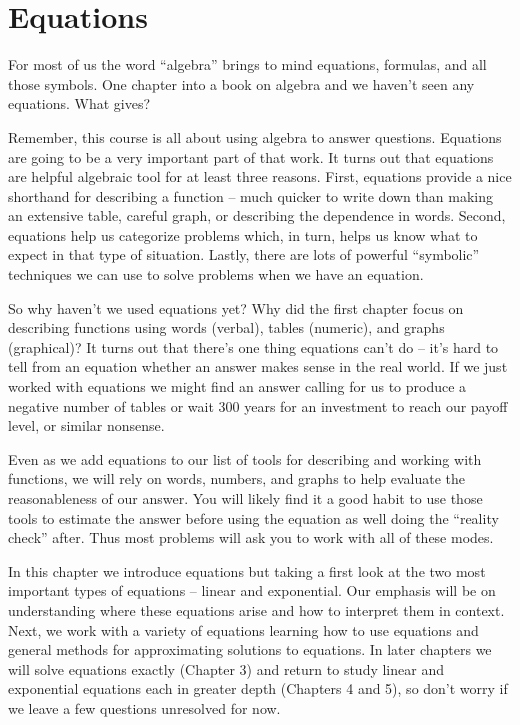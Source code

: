 \chapter{Equations}

For most of us the word ``algebra'' brings to mind equations, formulas, and all those symbols.  One chapter into a book on algebra and we haven't seen any equations.  What gives?   

Remember, this course is all about using algebra to answer questions.  Equations are going to be a very important part of that work.  It turns out that equations are helpful algebraic tool for at least three reasons.  First, equations provide a nice shorthand for describing a function -- much quicker to write down than making an extensive table, careful graph, or describing the dependence in words.  Second, equations help us categorize problems which, in turn, helps us know what to expect in that type of situation.  Lastly, there are lots of powerful ``symbolic'' techniques we can use to solve problems when we have an equation.

So why haven't we used equations yet?  Why did the first chapter focus on describing functions using words (verbal), tables (numeric), and graphs (graphical)?  It turns out that there's one thing equations can't do -- it's hard to tell from an equation whether an answer makes sense in the real world.  If we just worked with equations we might find an answer calling for us to produce a negative number of tables or wait 300 years for an investment to reach our payoff level, or similar nonsense.  

Even as we add equations to our list of tools for describing and working with functions, we will rely on words, numbers, and graphs to help evaluate the reasonableness of our answer.  You will likely find it a good habit to use those tools to estimate the answer before using the equation as well doing the ``reality check'' after.  Thus most problems will ask you to work with all of these modes.

In this chapter we introduce equations but taking a first look at the two most important types of equations -- linear and exponential.  Our emphasis will be on understanding where these equations arise and how to interpret them in context.  Next, we work with a variety of equations learning how to use equations and general methods for approximating solutions to equations.  In later chapters we will solve equations exactly (Chapter 3) and return to study linear and exponential equations each in greater depth (Chapters 4 and 5), so don't worry if we leave a few questions unresolved for now.